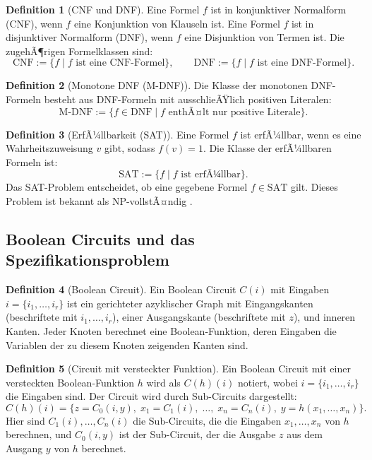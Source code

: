﻿\documentclass[a4paper,12pt]{article}
\theoremstyle{definition}
\newtheorem{definition}{Definition}
\begin{document}
\begin{definition}[CNF und DNF]
    Eine Formel $f$ ist in konjunktiver Normalform (CNF), wenn $f$ eine Konjunktion von Klauseln ist. Eine Formel $f$ ist in disjunktiver Normalform (DNF), wenn $f$ eine Disjunktion von Termen ist. Die zugehÃ¶rigen Formelklassen sind:
    \[
    \text{CNF} := \{ f \mid f \text{ ist eine CNF-Formel} \}, \qquad
    \text{DNF} := \{ f \mid f \text{ ist eine DNF-Formel} \}.
    \]
\end{definition}

\begin{definition}[Monotone DNF (M-DNF)]
    Die Klasse der monotonen DNF-Formeln besteht aus DNF-Formeln mit ausschlieÃŸlich positiven Literalen:
    \[
    \text{M-DNF} := \{ f \in \text{DNF} \mid f \text{ enthÃ¤lt nur positive Literale} \}.
    \]
\end{definition}

\begin{definition}[ErfÃ¼llbarkeit (SAT)]
    Eine Formel $f$ ist erfÃ¼llbar, wenn es eine Wahrheitszuweisung $v$ gibt, sodass $f(v) = 1$. Die Klasse der erfÃ¼llbaren Formeln ist:
    \[
    \text{SAT} := \{ f \mid f \text{ ist erfÃ¼llbar} \}.
    \]
    Das SAT-Problem entscheidet, ob eine gegebene Formel $f \in \text{SAT}$ gilt. Dieses Problem ist bekannt als NP-vollstÃ¤ndig \cite{Coo71}.
\end{definition}

\subsection{Boolean Circuits und das Spezifikationsproblem}

\begin{definition}[Boolean Circuit]
    Ein Boolean Circuit $C(i)$ mit Eingaben $i = \{i_1, \ldots, i_r\}$ ist ein gerichteter azyklischer Graph mit Eingangskanten (beschriftete mit $i_1, \ldots, i_r$), einer Ausgangskante (beschriftete mit $z$), und inneren Kanten. Jeder Knoten berechnet eine Boolean-Funktion, deren Eingaben die Variablen der zu diesem Knoten zeigenden Kanten sind.
\end{definition}

\begin{definition}[Circuit mit versteckter Funktion]
    Ein Boolean Circuit mit einer versteckten Boolean-Funktion $h$ wird als $C(h)(i)$ notiert, wobei $i = \{i_1, \ldots, i_r\}$ die Eingaben sind. Der Circuit wird durch Sub-Circuits dargestellt:
    \[
    C(h)(i) = \{ z = C_0(i, y),\; x_1 = C_1(i),\; \ldots,\; x_n = C_n(i),\; y = h(x_1, \ldots, x_n) \}.
    \]
    Hier sind $C_1(i), \ldots, C_n(i)$ die Sub-Circuits, die die Eingaben $x_1, \ldots, x_n$ von $h$ berechnen, und $C_0(i, y)$ ist der Sub-Circuit, der die Ausgabe $z$ aus dem Ausgang $y$ von $h$ berechnet.
\end{definition}
\end{document}
